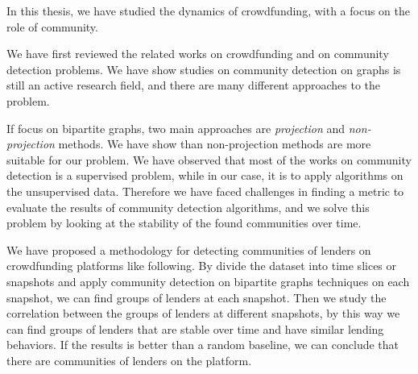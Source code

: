 \begin{comment}

This community finding is a unsupervised problem.
Hence, there are different methodology for answer the question


SOmething to try

- \lstinline|adjusted_rand_score|

\section{Future works}

\begin{itemize}
	\item Extend to other platforms
	\item Transform the problem into a classical clustering problem where cluster is a Tag/Sector
	      and apply classical dynamic clustering tools.
	      Note that this part is currently in trying phase.
	      If we have time to make it now, we could move it to the section 4.
\end{itemize}
\end{comment}

In this thesis, we have studied the dynamics of crowdfunding, with a focus on the role of community.

We have first reviewed the related works on crowdfunding and on community detection problems.
We have show studies on community detection on graphs is still an active research field,
and there are many different approaches to the problem.

If focus on bipartite graphs, two main approaches are \textit{projection} and \textit{non-projection} methods.
We have show than non-projection methods are more suitable for our problem.
We have observed that most of the works on community detection is a supervised problem,
while in our case, it is to apply algorithms on the unsupervised data.
Therefore we have faced challenges in finding a metric to evaluate the results of community detection algorithms,
and we solve this problem by looking at the stability of the found communities over time.

We have proposed a methodology for detecting communities of lenders on crowdfunding platforms like following.
By divide the dataset into time slices or snapshots
and apply community detection on bipartite graphs techniques on each snapshot,
we can find groups of lenders at each snapshot.
Then we study the correlation between the groups of lenders at different snapshots,
by this way we can find groups of lenders that are stable over time and have similar lending behaviors.
If the results is better than a random baseline, we can conclude that there are communities of lenders on the platform.

